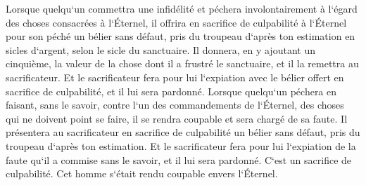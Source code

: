 \verse Lorsque quelqu`un commettra une infidélité et péchera involontairement à l`égard des choses consacrées à l`Éternel, il offrira en sacrifice de culpabilité à l`Éternel pour son péché un bélier sans défaut, pris du troupeau d`après ton estimation en sicles d`argent, selon le sicle du sanctuaire. 
\verse Il donnera, en y ajoutant un cinquième, la valeur de la chose dont il a frustré le sanctuaire, et il la remettra au sacrificateur. Et le sacrificateur fera pour lui l`expiation avec le bélier offert en sacrifice de culpabilité, et il lui sera pardonné. 
\verse Lorsque quelqu`un péchera en faisant, sans le savoir, contre l`un des commandements de l`Éternel, des choses qui ne doivent point se faire, il se rendra coupable et sera chargé de sa faute. 
\verse Il présentera au sacrificateur en sacrifice de culpabilité un bélier sans défaut, pris du troupeau d`après ton estimation. Et le sacrificateur fera pour lui l`expiation de la faute qu`il a commise sans le savoir, et il lui sera pardonné. 
\verse C`est un sacrifice de culpabilité. Cet homme s`était rendu coupable envers l`Éternel. 

\chapter{}

